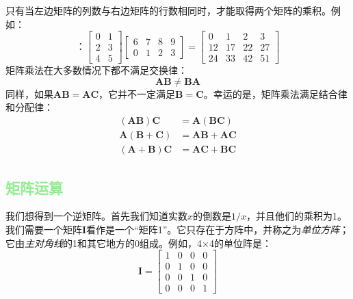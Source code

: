 只有当左边矩阵的列数与右边矩阵的行数相同时，才能取得两个矩阵的乘积。例如：
\[：\left[\begin{array}{ll}
      0 & 1 \\
      2 & 3 \\
      4 & 5
    \end{array}\right]\left[\begin{array}{llll}
      6 & 7 & 8 & 9 \\
      0 & 1 & 2 & 3
    \end{array}\right]=\left[\begin{array}{rrrr}
      0  & 1  & 2  & 3  \\
      12 & 17 & 22 & 27 \\
      24 & 33 & 42 & 51
    \end{array}\right]
\]
矩阵乘法在大多数情况下都不满足交换律：
\begin{equation}
  \mathbf{AB} \neq \mathbf{BA}
\end{equation}
同样，如果$\mathbf{AB} = \mathbf{AC}$，它并不一定满足$\mathbf{B} = \mathbf{C}$。幸运的是，矩阵乘法满足结合律和分配律：
\[
  \begin{aligned}
    (\mathbf{A B}) \mathbf{C}          & =\mathbf{A}(\mathbf{B C})  \\
    \mathbf{A}(\mathbf{B}+\mathbf{C})  & =\mathbf{A B}+\mathbf{A C} \\
    (\mathbf{A}+\mathbf{B}) \mathbf{C} & =\mathbf{A C}+\mathbf{B C}
  \end{aligned}
\]

\subsection{\textcolor{lightgreen}{矩阵运算}}

我们想得到一个逆矩阵。首先我们知道实数$x$的倒数是$1/x$，并且他们的乘积为1。我们需要一个矩阵$\mathbf{I}$看作是一个“矩阵1”。它只存在于方阵中，并称之为\textit{单位方阵}；它由\textit{主对角线}的1和其它地方的0组成。例如，4×4的单位阵是：
\[
  \mathbf{I}=\left[\begin{array}{llll}
      1 & 0 & 0 & 0 \\
      0 & 1 & 0 & 0 \\
      0 & 0 & 1 & 0 \\
      0 & 0 & 0 & 1
    \end{array}\right]
\]

